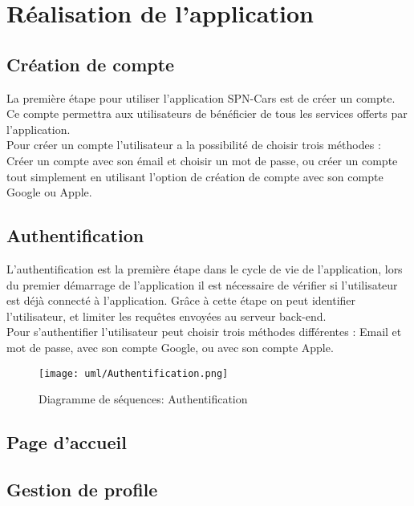 \thispagestyle{plain}
\section{Réalisation de l'application}
\subsection{Création de compte}
La première étape pour utiliser l'application SPN-Cars est de créer un compte. Ce compte permettra aux utilisateurs de bénéficier de tous les services offerts par l'application.\\
\noindent Pour créer un compte l'utilisateur a la possibilité de choisir trois méthodes : Créer un compte avec son émail et choisir un mot de passe, ou créer un compte tout simplement en utilisant l'option de création de compte avec son compte Google ou Apple.
\subsection{Authentification}
L'authentification est la première étape dans le cycle de vie de l'application, lors du premier démarrage de l'application il est nécessaire de vérifier si l'utilisateur est déjà connecté à l'application. Grâce à cette étape on peut identifier l'utilisateur, et limiter les requêtes envoyées au serveur back-end.\\
\noindent Pour s'authentifier l'utilisateur peut choisir trois méthodes différentes : Email et mot de passe, avec son compte Google, ou avec son compte Apple.
\vspace{1cm}
\begin{figure}[H]
    \centering
    \texttt{[image: uml/Authentification.png]}
    \vspace{1cm}
    \caption{Diagramme de séquences: Authentification}
    \label{fig:seq_auth}
\end{figure}
\subsection{Page d'accueil}
\subsection{Gestion de profile}
